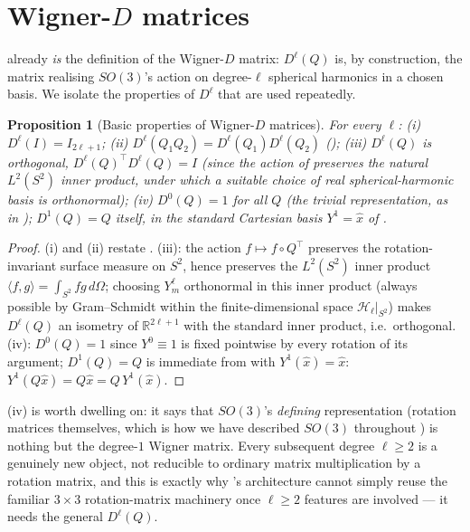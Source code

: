 \documentclass[11pt,a4paper]{report}
\newtheorem{proposition}[proposition]{Proposition}
\theoremstyle{definition}
\theoremstyle{remark}
\newcommand{\RR}{\mathbb R}
\begin{document}
\section{Wigner-$D$ matrices}
\label{sec:wigner-d-derivation}

 already \emph{is} the definition of the
Wigner-$D$ matrix: $D^\ell(Q)$ is, by construction, the matrix realising
$SO(3)$'s action on degree-$\ell$ spherical harmonics in a chosen basis. We
isolate the properties of $D^\ell$ that are used repeatedly.

\begin{proposition}[Basic properties of Wigner-$D$ matrices]
\label{prop:wigner-properties}
For every $\ell$: (i) $D^\ell(I)=I_{2\ell+1}$; (ii)
$D^\ell(Q_1Q_2)=D^\ell(Q_1)D^\ell(Q_2)$ (); (iii)
$D^\ell(Q)$ is orthogonal, $D^\ell(Q)^\top D^\ell(Q)=I$ (since the action of
 preserves the natural $L^2(S^2)$ inner product,
under which a suitable choice of real spherical-harmonic basis is
orthonormal); (iv) $D^0(Q)=1$ for all $Q$ (the trivial representation, as
in ); $D^1(Q)=Q$ itself, in the standard Cartesian basis
$Y^1=\hat x$ of .
\end{proposition}

\begin{proof}
(i) and (ii) restate . (iii): the action
$f\mapsto f\circ Q^\top$ preserves the rotation-invariant surface measure
on $S^2$, hence preserves the $L^2(S^2)$ inner product
$\langle f,g\rangle=\int_{S^2}fg\,d\Omega$; choosing $Y^\ell_m$ orthonormal
in this inner product (always possible by Gram--Schmidt within the
finite-dimensional space $\mathcal H_\ell|_{S^2}$) makes $D^\ell(Q)$ an
isometry of $\RR^{2\ell+1}$ with the standard inner product, i.e.\
orthogonal. (iv): $D^0(Q)=1$ since $Y^0\equiv1$ is fixed pointwise by every
rotation of its argument; $D^1(Q)=Q$ is immediate from
 with $Y^1(\hat x)=\hat x$:
$Y^1(Q\hat x)=Q\hat x=Q\,Y^1(\hat x)$.
\end{proof}

(iv) is worth dwelling on: it says that
$SO(3)$'s \emph{defining} representation (rotation matrices themselves,
which is how we have described $SO(3)$ throughout \Cref{chap:groups}) is
nothing but the degree-$1$ Wigner matrix. Every subsequent degree
$\ell\ge2$ is a genuinely new object, not reducible to ordinary matrix
multiplication by a rotation matrix, and this is exactly why
's architecture cannot simply reuse the familiar
$3\times3$ rotation-matrix machinery once $\ell\ge2$ features are involved
--- it needs the general $D^\ell(Q)$.
\end{document}
